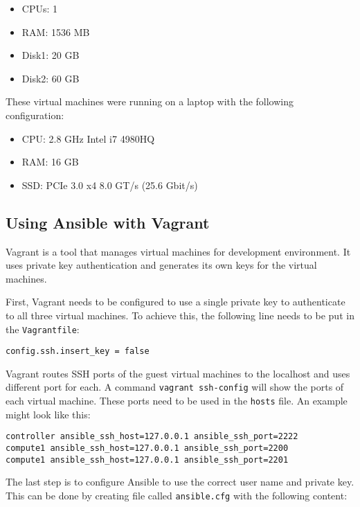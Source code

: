\begin{itemize}
  \item{CPUs: 1}
  \item{RAM: 1536 MB}
  \item{Disk1: 20 GB}
  \item{Disk2: 60 GB}
\end{itemize}

These virtual machines were running on a laptop with the following configuration:

\begin{itemize}
  \item{CPU: 2.8 GHz Intel i7 4980HQ}
  \item{RAM: 16 GB}
  \item{SSD: PCIe 3.0 x4 8.0 GT/s (25.6 Gbit/s)}
\end{itemize}

\subsection{Using Ansible with Vagrant}

Vagrant is a tool that manages virtual machines for development environment. It uses private key authentication and generates its own keys for the virtual machines.

First, Vagrant needs to be configured to use a single private key to authenticate to all three virtual machines. To achieve this, the following line needs to be put in the \texttt{Vagrantfile}:


\begin{lstlisting}
config.ssh.insert_key = false
\end{lstlisting}



Vagrant routes SSH ports of the guest virtual machines to the localhost and uses different port for each. A command \texttt{vagrant ssh-config} will show the ports of each virtual machine. These ports need to be used in the \texttt{hosts} file. An example might look like this:

\begin{lstlisting}
controller ansible_ssh_host=127.0.0.1 ansible_ssh_port=2222
compute1 ansible_ssh_host=127.0.0.1 ansible_ssh_port=2200
compute1 ansible_ssh_host=127.0.0.1 ansible_ssh_port=2201
\end{lstlisting}

The last step is to configure Ansible to use the correct user name and private key. This can be done by creating file called \texttt{ansible.cfg} with the following content:

